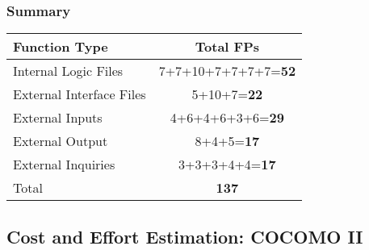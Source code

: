 \subsubsection{Summary}

\begin{center}
\begin{tabular}{ |l|c| }
\hline
\textbf{Function Type} & \textbf{Total FPs} \\
\hline
Internal Logic Files & 7+7+10+7+7+7+7=\textbf{52} \\
\hline
External Interface Files & 5+10+7=\textbf{22}\\
\hline
External Inputs & 4+6+4+6+3+6=\textbf{29} \\ 
\hline
External Output & 8+4+5=\textbf{17} \\
\hline
External Inquiries & 3+3+3+4+4=\textbf{17} \\
\hline
Total & \textbf{137}\\
\hline
\end{tabular}
\end{center}


\subsection{Cost and Effort Estimation: COCOMO II}